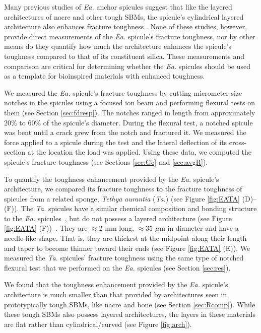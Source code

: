 \documentclass[12pt,onecolumn]{article}
\makeatletter
\newcommand{\TA}{\textit{Ta.\@}\xspace}
\newcommand{\EA}{\textit{Ea.\@}\xspace}
\makeatother
\begin{document}
\begin{bibunit}
Many previous studies of \EA anchor spicules suggest that like the layered architectures of nacre and other tough SBMs, the spicule's cylindrical layered architecture also enhances fracture toughness \cite{mayer2005rigid,mayer2011new,walter2007mechanisms,kolednik2011bioinspired}. None of these studies, however, provide direct measurements of the \EA spicule's fracture toughness, nor by other means do they quantify how much the architecture enhances the spicule's toughness compared to that of its constituent silica. These measurements and comparison are critical for determining whether the \EA spicules should be used as a template for bioinspired materials with enhanced toughness. 

We measured the \EA spicule's fracture toughness by cutting micrometer-size notches in the spicules using a focused ion beam and performing flexural tests on them (see Section \ref{sec:fdresp}). The notches ranged in length from approximately 20\% to 60\% of the spicule's diameter. During the flexural test, a notched spicule was bent until a crack grew from the notch and fractured it. We measured the force applied to a spicule during the test and the lateral deflection of its cross-section at the location the load was applied. Using these data, we computed the spicule's fracture toughness (see Sections \ref{sec:Gc} and \ref{sec:avgR}).

To quantify the toughness enhancement provided by the \EA spicule's architecture, we compared its fracture toughness to the fracture toughness of spicules from a related sponge, \textit{Tethya aurantia} (\TA) (see Figure \ref{fig:EATA} (D)--(F)). The \TA spicules have a similar chemical composition and bonding structure to the \EA spicules~\cite{weaver2010unifying}, but do not possess a layered architecture (see Figure \ref{fig:EATA} (F))~\cite{monn2017new}. They are $\approx$2 mm long, $\approx$35 $\mu$m in diameter and have a needle-like shape. That is, they are thickest at the midpoint along their length and taper to become thinner toward their ends (see Figure \ref{fig:EATA} (E)). We measured the \TA spicules' fracture toughness using the same type of notched flexural test that we performed on the \EA spicules (see Section \ref{sec:res}). 

We found that the toughness enhancement provided by the \EA spicule's architecture is much smaller than that provided by architectures seen in prototypically tough SBMs, like nacre and bone (see Section \ref{sec:Rcomp}). While these tough SBMs also possess layered architectures, the layers in these materials are flat rather than cylindrical/curved (see Figure \ref{fig:arch}). 


\end{bibunit}
\end{document}
